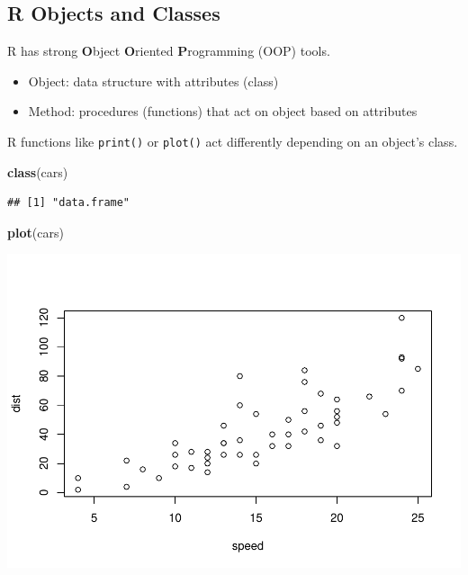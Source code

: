 \documentclass[
]{book}
\newenvironment{Shaded}{\begin{snugshade}}{\end{snugshade}}
\newcommand{\KeywordTok}[1]{\textcolor[rgb]{0.13,0.29,0.53}{\textbf{#1}}}
\newcommand{\NormalTok}[1]{#1}
\theoremstyle{definition}
\theoremstyle{definition}
\theoremstyle{definition}
\theoremstyle{remark}
\begin{document}
\hypertarget{r-objects-and-classes-1}{%
\subsection{R Objects and Classes}\label{r-objects-and-classes-1}}

R has strong \textbf{O}bject \textbf{O}riented \textbf{P}rogramming (OOP) tools.

\begin{itemize}
\item
  Object: data structure with attributes (class)
\item
  Method: procedures (functions) that act on object based on attributes
\end{itemize}

R functions like \texttt{print()} or \texttt{plot()} act differently depending on an object's class.

\begin{Shaded}
\begin{Highlighting}[]
\KeywordTok{class}\NormalTok{(cars)}
\end{Highlighting}
\end{Shaded}

\begin{verbatim}
## [1] "data.frame"
\end{verbatim}

\begin{Shaded}
\begin{Highlighting}[]
\KeywordTok{plot}\NormalTok{(cars)}
\end{Highlighting}
\end{Shaded}

\includegraphics{StatisticalMethods_files/figure-latex/unnamed-chunk-26-1.pdf}
\end{document}

